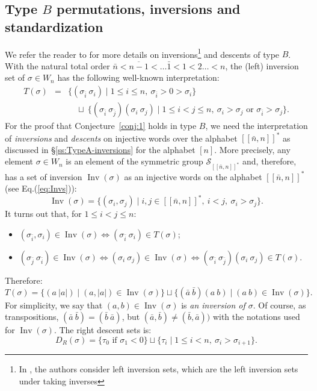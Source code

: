 \documentclass[Unicode]{cedram-alco}
\theoremstyle{definition}
\DeclareMathOperator{\invs}{Inv}
\newcommand{\Bsetnn}{[\![\bar{n},n ]\!]^*}
\begin{document}
\subsection{Type \texorpdfstring{$B$}{B} permutations, inversions and standardization} We refer the reader to \cite[\S8.1]{BjBr05} for more details on inversions\footnote{In \cite{BjBr05}, the authors consider left inversion sets, which are the left inversion sets under taking inverses} and descents of type $B$. With the natural total order $\bar n<\overline{n-1}<\dots \bar 1<1<2\dots <n$, the (left) inversion set of $\sigma\in W_n$ has the following well-known interpretation:
\begin{eqnarray*}
T(\sigma)&=&\{(\sigma_{\bar i} \ \sigma_i )\mid 1\leq i\leq n,\ \sigma_{\bar i} > 0>\sigma_i \}\\
&&\quad \sqcup\ \{  (\sigma_{\bar i}\ \sigma_{\bar j})(\sigma_i\ \sigma_j) \mid 1\leq i< j\leq n,  \  \sigma_i>\sigma_j\textrm{ or }\sigma_{\bar i}>\sigma_j \}.
\end{eqnarray*}
For the proof that Conjecture~\ref{conj:1} holds in type $B$, we need the interpretation of {\em inversions} and {\em descents} on injective words over the alphabet $\Bsetnn$ as discussed in \S\ref{ss:TypeA-inversions} for the alphabet $[n]$. More precisely, any element $\sigma\in W_n$ is an element of  the symmetric group $\mathcal S_{\Bsetnn}$ and, therefore, has a set of inversion $\invs(\sigma)$  as an injective words  on the alphabet $\Bsetnn$ (see Eq.(\ref{eq:Invs})):
$$
\invs(\sigma)=\{(\sigma_i, \sigma_j)\mid  i,j\in \Bsetnn,\  i<j,\ \sigma_i > \sigma_j \}.
$$
It turns out that, for $1\leq i< j\leq n$:
\begin{itemize}
\item $(\sigma_{\bar i}, \sigma_i )\in \invs(\sigma)\iff(\sigma_{\bar i} \ \sigma_i )\in T(\sigma)$;
\item $(\sigma_{\bar j}\ \sigma_{\bar i})\in \invs(\sigma)\iff (\sigma_i\ \sigma_j)\in\invs(\sigma)\iff  (\sigma_{\bar i}\ \sigma_{\bar j})(\sigma_i\ \sigma_j)\in T(\sigma)$. 
\end{itemize}
Therefore:
\begin{equation}\label{eq:InvTypeB}
T(\sigma)=\{(a\ |a|) \mid  (a,|a|)\in \invs(\sigma)\}\sqcup\{(\bar a\ \bar b)(a\ b)\mid (a\ b)\in \invs(\sigma)\}.
\end{equation}
For simplicity, we say that $(a,b)\in\invs(\sigma)$ is {\em an inversion of $\sigma$}. Of course, as transpositions, $(\bar a\ \bar b)=(\bar b \ \bar a)$, but $(\bar a, \bar b)\not =(\bar b,\bar a))$ with the notations used for $\invs(\sigma)$. The right descent sets is:
$$
D_R(\sigma)= \{\tau_0 \textrm{ if } \sigma_1<0\} \sqcup \{\tau_i \mid 1\leq i < n,\ \sigma_i >\sigma_{i+1}\}.
$$ 
\end{document}
